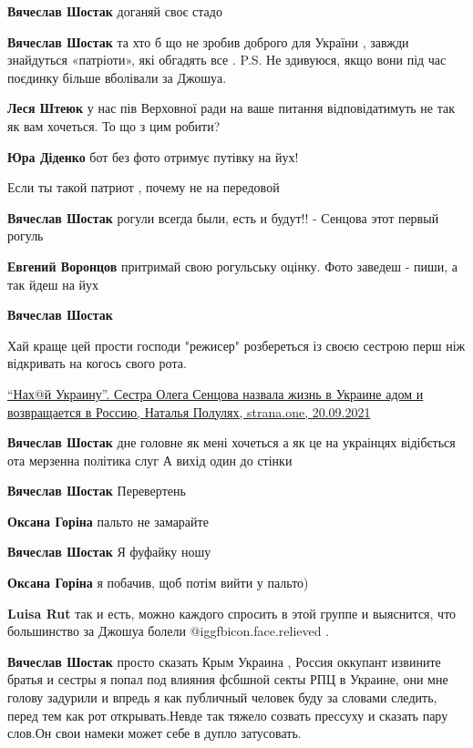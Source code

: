 \begin{itemize}
\begin{itemize}
\textbf{Вячеслав Шостак} доганяй своє стадо

\textbf{Вячеслав Шостак} та хто б що не зробив доброго для України , завжди знайдуться «патріоти», які обгадять все .
P.S. Не здивуюся, якщо вони під час поєдинку більше вболівали за Джошуа.

\textbf{Леся Штеюк} у нас пів Верховної ради на ваше питання відповідатимуть не так як вам хочеться. То що з цим робити?

\textbf{Юра Діденко} бот без фото отримує путівку на йух!

Если ты такой патриот , почему не на передовой

\textbf{Вячеслав Шостак} рогули всегда были, есть и будут!! - Сенцова этот первый рогуль

\textbf{Евгений Воронцов} притримай свою рогульську оцінку.
Фото заведеш - пиши, а так йдеш на йух

\textbf{Вячеслав Шостак} 

Хай краще цей прости господи "режисер" розбереться із своєю сестрою перш ніж
відкривать на когось свого рота. 

\href{https://strana.one/news/354204-sestra-sentsova-nazvala-zhizn-v-ukraine-adom-i-vozvrashchaetsja-v-rossiju.html}{%
\enquote{Нах@й Украину}. Сестра Олега Сенцова назвала жизнь в Украине адом и возвращается в Россию, %
Наталья Полулях, strana.one, 20.09.2021%
}

\textbf{Вячеслав Шостак} дне головне як мені хочеться а як це на украінцях відібється ота мерзенна політика слуг А вихід один до стінки

\textbf{Вячеслав Шостак} Перевертень

\textbf{Оксана Горіна} пальто не замарайте

\textbf{Вячеслав Шостак} Я фуфайку ношу

\textbf{Оксана Горіна} я побачив, щоб потім вийти у пальто)

\textbf{Luisa Rut} так и есть, можно каждого спросить в этой группе и выяснится, что большинство за Джошуа болели @igg{fbicon.face.relieved} .

\textbf{Вячеслав Шостак} просто сказать Крым Украина , Россия оккупант извините братья и сестры я попал под влияния фсбшной секты РПЦ в Украине, они мне голову задурили и впредь я как публичный человек буду за словами следить, перед тем как рот открывать.Невде так тяжело созвать прессуху и сказать пару слов.Он свои намеки может себе в дупло затусовать.


\end{itemize}
\end{itemize}
